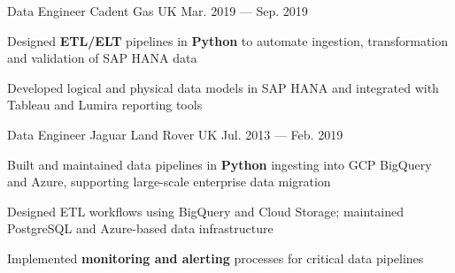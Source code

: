 \begin{cventries}
  \cventry
  {Data Engineer} %
  {Cadent Gas} %
  {UK} %
  {Mar. 2019 --- Sep. 2019} %
  {
    \begin{cvitems}
    \item {Designed \textbf{ETL/ELT} pipelines in \textbf{Python} to automate ingestion, transformation and validation of SAP HANA data}
    \item {Developed logical and physical data models in SAP HANA and integrated with Tableau and Lumira reporting tools}
    \end{cvitems}
  }

  \cventry
  {Data Engineer} %
  {Jaguar Land Rover} %
  {UK} %
  {Jul. 2013 --- Feb. 2019} %
  {
    \begin{cvitems}
    \item {Built and maintained data pipelines in \textbf{Python} ingesting into GCP BigQuery and Azure, supporting large-scale enterprise data migration}
    \item {Designed ETL workflows using BigQuery and Cloud Storage; maintained PostgreSQL and Azure-based data infrastructure}
    \item {Implemented \textbf{monitoring and alerting} processes for critical data pipelines}
    \end{cvitems}
  }

\end{cventries}
